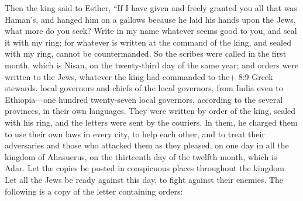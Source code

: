  Then the king said to Esther, ``If I have given and freely
granted you all that was Haman's, and hanged him on a gallows because he
laid his hands upon the Jews, what more do you seek?  Write
in my name whatever seems good to you, and seal it with my ring; for
whatever is written at the command of the king, and sealed with my ring,
cannot be countermanded.  So the scribes were called in the
first month, which is Nisan, on the twenty-third day of the same year;
and orders were written to the Jews, whatever the king had commanded to
the+ 8:9 Greek stewards. local governors and chiefs of the local
governors, from India even to Ethiopia---one hundred twenty-seven local
governors, according to the several provinces, in their own languages.
 They were written by order of the king, sealed with his
ring, and the letters were sent by the couriers.  In them,
he charged them to use their own laws in every city, to help each other,
and to treat their adversaries and those who attacked them as they
pleased,  on one day in all the kingdom of Ahasuerus, on
the thirteenth day of the twelfth month, which is Adar. 
Let the copies be posted in conspicuous places throughout the kingdom.
Let all the Jews be ready against this day, to fight against their
enemies. The following is a copy of the letter containing orders:

